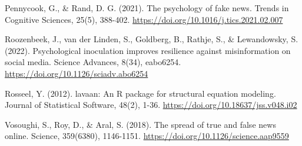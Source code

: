 \documentclass[11pt]{article}
\begin{document}
\noindent Pennycook, G., \& Rand, D. G. (2021). The psychology of fake news. Trends in Cognitive Sciences, 25(5), 388-402. \url{https://doi.org/10.1016/j.tics.2021.02.007}\par

\noindent Roozenbeek, J., van der Linden, S., Goldberg, B., Rathje, S., \& Lewandowsky, S. (2022). Psychological inoculation improves resilience against misinformation on social media. Science Advances, 8(34), eabo6254. \url{https://doi.org/10.1126/sciadv.abo6254}\par

\noindent Rosseel, Y. (2012). lavaan: An R package for structural equation modeling. Journal of Statistical Software, 48(2), 1-36. \url{https://doi.org/10.18637/jss.v048.i02}\par

\noindent Vosoughi, S., Roy, D., \& Aral, S. (2018). The spread of true and false news online. Science, 359(6380), 1146-1151. \url{https://doi.org/10.1126/science.aap9559}\par
\endgroup
\end{document}
